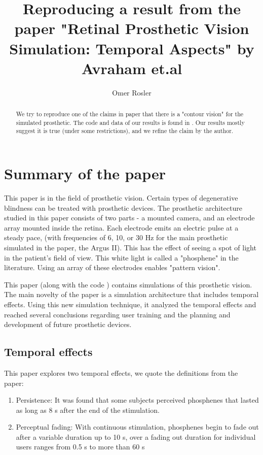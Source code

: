 \documentclass[]{article}
\title{Reproducing a result from the paper "Retinal Prosthetic Vision Simulation:
	Temporal Aspects" by Avraham et.al}
\author{Omer Rosler}
\begin{document}
\maketitle


\begin{abstract}
	
We try to reproduce one of the claims in paper \cite{main_paper} that there is a "contour vision" for the simulated prosthetic.  The code and data of our results is found in \cite{our_code}. Our results mostly suggest it is true (under some restrictions), and we refine the claim by the author.
	
\end{abstract}

\section{Summary of the paper}

This paper \cite{main_paper} is in the field of prosthetic vision. Certain types of degenerative blindness can be treated with prosthetic devices. The prosthetic architecture studied in this paper consists of two parts -  a mounted camera, and an electrode array mounted inside the retina. Each electrode emits an electric pulse at a steady pace, (with frequencies of 6, 10, or 30 Hz for the main prosthetic simulated in the paper, the Argus II). This has the effect of seeing a spot of light in the patient's field of view. This white light is called a "phosphene" in the literature. Using an array of these electrodes enables "pattern vision".

This paper (along with the code \cite{paper_code}) contains simulations of this prosthetic vision. The main novelty of the paper is a simulation architecture that includes temporal effects. Using this new simulation technique, it analyzed the temporal effects and reached several conclusions regarding user training and the planning and development of future prosthetic devices.

\subsection{Temporal effects}
This paper explores two temporal effects, we quote the definitions from the paper:

\begin{enumerate}
	\item Persistence: It was found that some subjects perceived phosphenes that lasted as long as 8 s after the end of the stimulation. 
	\item Perceptual fading: With continuous stimulation, phosphenes begin to fade out after a variable duration up to 10 s, over a fading out
	duration for individual users ranges from 0.5 s to more than 60 s
\end{enumerate}
\end{document}
